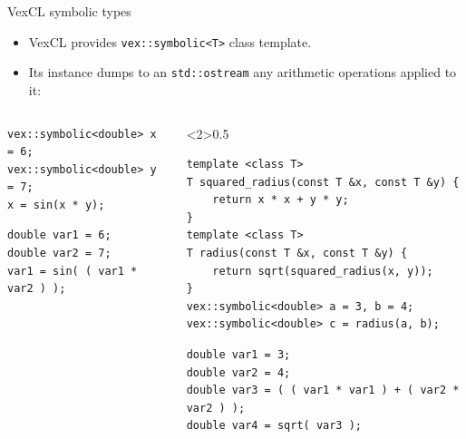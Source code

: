 \documentclass[@BEAMER_OPTIONS@]{beamer}
\newcommand{\code}[1]{\lstinline|#1|}
\begin{document}
\begin{frame}[fragile]{VexCL symbolic types}
    \begin{itemize}
        \item VexCL provides \code{vex::symbolic<T>} class template.
        \item Its instance dumps to an \code{std::ostream} any
            arithmetic operations applied to it:
    \end{itemize}
    \begin{columns}
        \begin{column}{0.35\textwidth}
            \begin{exampleblock}{}
                \begin{lstlisting}
vex::symbolic<double> x = 6;
vex::symbolic<double> y = 7;
x = sin(x * y);
                \end{lstlisting}
            \end{exampleblock}
            \begin{small}
                \begin{verbatim}
double var1 = 6;
double var2 = 7;
var1 = sin( ( var1 * var2 ) );
                \end{verbatim}
            \end{small}
        \end{column}
        \begin{column}<2>{0.5\textwidth}
            \begin{exampleblock}{}
                \begin{lstlisting}
template <class T>
T squared_radius(const T &x, const T &y) {
    return x * x + y * y;
}
template <class T>
T radius(const T &x, const T &y) {
    return sqrt(squared_radius(x, y));
}
vex::symbolic<double> a = 3, b = 4;
vex::symbolic<double> c = radius(a, b);
                \end{lstlisting}
            \end{exampleblock}
            \begin{small}
                \begin{verbatim}
double var1 = 3;
double var2 = 4;
double var3 = ( ( var1 * var1 ) + ( var2 * var2 ) );
double var4 = sqrt( var3 );
                \end{verbatim}
            \end{small}
        \end{column}
    \end{columns}
\end{frame}
\end{document}
